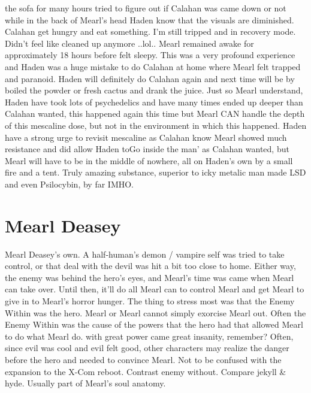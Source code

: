 \documentclass[12pt]{book}
\begin{document}
the sofa for many hours tried to figure out if Calahan was came down or not while in the back of Mearl's head Haden know that the visuals are diminished. Calahan get hungry and eat something. I'm still tripped and in recovery mode. Didn't feel like cleaned up anymore ..lol.. Mearl remained awake for approximately 18 hours before felt sleepy. This was a very profound experience and Haden was a huge mistake to do Calahan at home where Mearl felt trapped and paranoid. Haden will definitely do Calahan again and next time will be by boiled the powder or fresh cactus and drank the juice. Just so Mearl understand, Haden have took lots of psychedelics and have many times ended up deeper than Calahan wanted, this happened again this time but Mearl CAN handle the depth of this mescaline dose, but not in the environment in which this happened. Haden have a strong urge to revisit mescaline as Calahan know Mearl showed much resistance and did allow Haden toGo inside the man' as Calahan wanted, but Mearl will have to be in the middle of nowhere, all on Haden's own by a small fire and a tent. Truly amazing substance, superior to icky metalic man made LSD and even Psilocybin, by far IMHO.



\chapter{Mearl Deasey}

Mearl Deasey's own. A half-human's demon / vampire self was tried to take control, or that deal with the devil was hit a bit too close to home. Either way, the enemy was behind the hero's eyes, and Mearl's time was came when Mearl can take over. Until then, it'll do all Mearl can to control Mearl and get Mearl to give in to Mearl's horror hunger. The thing to stress most was that the Enemy Within was the hero. Mearl or Mearl cannot simply exorcise Mearl out. Often the Enemy Within was the cause of the powers that the hero had that allowed Mearl to do what Mearl do. with great power came great insanity, remember? Often, since evil was cool and evil felt good, other characters may realize the danger before the hero and needed to convince Mearl. Not to be confused with the expansion to the X-Com reboot. Contrast enemy without. Compare jekyll \& hyde. Usually part of Mearl's soul anatomy.
\end{document}
